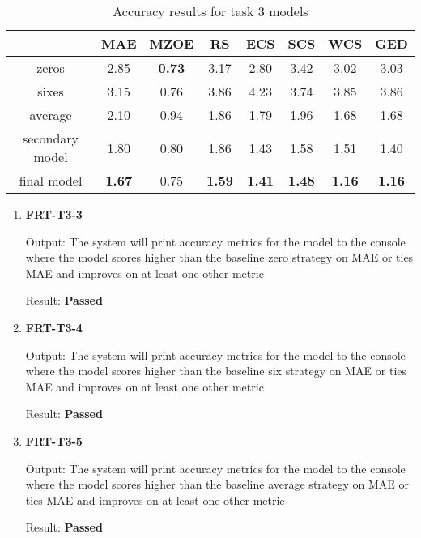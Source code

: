 \documentclass[12pt, titlepage]{article}
\begin{document}
\begin{enumerate}
\begin{table}[H]
\begin{tabular}{c|ccccccc}                                                                                                                                                                                                                          
  &  MAE   & MZOE  & RS    & ECS   & SCS   & WCS   & GED \\ \hline
zeros  & 2.85  & \textbf{0.73}  & 3.17  & 2.80  & 3.42  & 3.02  & 3.03 \\
sixes  & 3.15  & 0.76  & 3.86  & 4.23  & 3.74  & 3.85  & 3.86 \\
average & 2.10  & 0.94  & 1.86  & 1.79  & 1.96  & 1.68  & 1.68 \\
secondary model  & 1.80  & 0.80  & 1.86  & 1.43  & 1.58  & 1.51  & 1.40 \\
final model  & \textbf{1.67}  & 0.75  & \textbf{1.59}  & \textbf{1.41}  & \textbf{1.48}  & \textbf{1.16} & \textbf{1.16} \\
\end{tabular}
\caption{Accuracy results for task 3 models}
\label{T3Acc}
\end{table}

\begin{enumerate}

\item \textbf{FRT-T3-3}

Output: The system will print accuracy metrics for the model to the console where the model scores higher than the baseline zero strategy on MAE or ties MAE and improves on at least one other metric

Result: \textbf{Passed}

\item \textbf{FRT-T3-4}

Output: The system will print accuracy metrics for the model to the console where the model scores higher than the baseline six strategy on MAE or ties MAE and improves on at least one other metric

Result: \textbf{Passed}

\item \textbf{FRT-T3-5}

Output: The system will print accuracy metrics for the model to the console where the model scores higher than the baseline average strategy on MAE or ties MAE and improves on at least one other metric

Result: \textbf{Passed}




\end{enumerate}
\end{enumerate}
\end{document}
